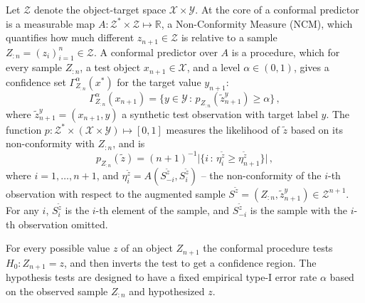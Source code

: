 \documentclass[conference]{IEEEtran}
\newcommand{\Xcal}{\mathcal{X}}
\newcommand{\Ycal}{\mathcal{Y}}
\newcommand{\Zcal}{\mathcal{Z}}
\newcommand{\Real}{\mathbb{R}}
\begin{document}
Let $\Zcal$ denote the object-target space $\Xcal \times \Ycal$. At the core of a
conformal predictor is a measurable map $A: \Zcal^*\times \Zcal \mapsto \Real$, a
Non-Conformity Measure (NCM), which quantifies how much different $z_{n+1} \in \Zcal$
is relative to a sample $Z_{:n} = (z_i)_{i=1}^n\in\Zcal$. A conformal predictor over
$A$ is a procedure, which for every sample $Z_{:n}$, a test object $x_{n+1} \in \Xcal$,
and a level $\alpha \in (0,1)$, gives a confidence set $\Gamma_{Z_{:n}}^\alpha(x^*)$
for the target value $y_{n+1}$:
\begin{equation} \label{eq:conf_pred_set}
  \Gamma_{Z_{:n}}^\alpha(x_{n+1})
    = \bigl\{ y\in \Ycal \,:\, p_{Z_{:n}}(\tilde{z}^y_{n+1}) \geq \alpha \bigr\} \,,
\end{equation}
where $\tilde{z}^y_{n+1} = (x_{n+1}, y)$ a synthetic test observation with target
label $y$. The function $p:\Zcal^*\times (\Xcal\times \Ycal)\mapsto [0,1]$ measures
the likelihood of $\tilde{z}$ based on its non-conformity with $Z_{:n}$, and is
\begin{equation} \label{eq:conf_p_value}
  p_{Z_{:n}}(\tilde{z})
    = (n+1)^{-1} \bigl\lvert\{ i \,:\,
      \eta_i^{\tilde{z}} \geq \eta_{n+1}^{\tilde{z}} \}\bigr\rvert \,,
\end{equation}
where $i=1,\ldots, n+1$, and $\eta_i^{\tilde{z}} = A(S^{\tilde{z}}_{-i}, S^{\tilde{z}}_i)$
-- the non-conformity of the $i$-th observation with respect to the augmented sample
$S^{\tilde{z}} = (Z_{:n}, {\tilde{z}}^y_{n+1}) \in \Zcal^{n+1}$. For any $i$, $S^{\tilde{z}}_i$
is the $i$-th element of the sample, and $S^{\tilde{z}}_{-i}$ is the sample with the $i$-th
observation omitted.


For every possible value $z$ of an object $Z_{n+1}$ the conformal procedure tests
$H_0: Z_{n+1} = z$, and then inverts the test to get a confidence region. The hypothesis
tests are designed to have a fixed empirical type-I error rate $\alpha$ based on
the observed sample $Z_{:n}$ and hypothesized $z$.
\end{document}

